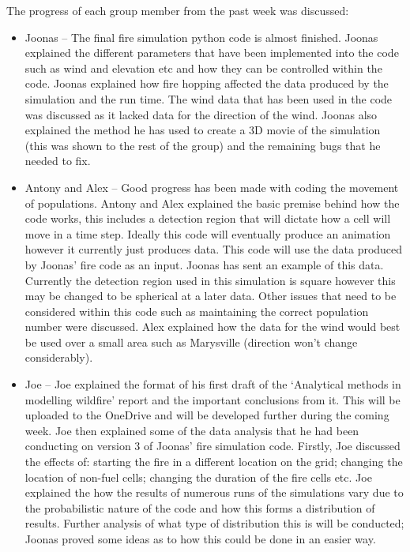 The progress of each group member from the past week was discussed:
\begin{itemize}
    \item Joonas – The final fire simulation python code is almost finished. Joonas explained the different parameters that have been implemented into the code such as wind and elevation etc and how they can be controlled within the code. Joonas explained how fire hopping affected the data produced by the simulation and the run time. The wind data that has been used in the code was discussed as it lacked data for the direction of the wind. Joonas also explained the method he has used to create a 3D movie of the simulation (this was shown to the rest of the group) and the remaining bugs that he needed to fix.
    \item Antony and Alex – Good progress has been made with coding the movement of populations. Antony and Alex explained the basic premise behind how the code works, this includes a detection region that will dictate how a cell will move in a time step. Ideally this code will eventually produce an animation however it currently just produces data. This code will use the data produced by Joonas’ fire code as an input. Joonas has sent an example of this data. Currently the detection region used in this simulation is square however this may be changed to be spherical at a later data. Other issues that need to be considered within this code such as maintaining the correct population number were discussed. Alex explained how the data for the wind would best be used over a small area such as Marysville (direction won’t change considerably).
    \item Joe – Joe explained the format of his first draft of the ‘Analytical methods in modelling wildfire’ report and the important conclusions from it. This will be uploaded to the OneDrive and will be developed further during the coming week. Joe then explained some of the data analysis that he had been conducting on version 3 of Joonas’ fire simulation code. Firstly, Joe discussed the effects of: starting the fire in a different location on the grid; changing the location of non-fuel cells; changing the duration of the fire cells etc. Joe explained the how the results of numerous runs of the simulations vary due to the probabilistic nature of the code and how this forms a distribution of results. Further analysis of what type of distribution this is will be conducted; Joonas proved some ideas as to how this could be done in an easier way. 
\end{itemize}

